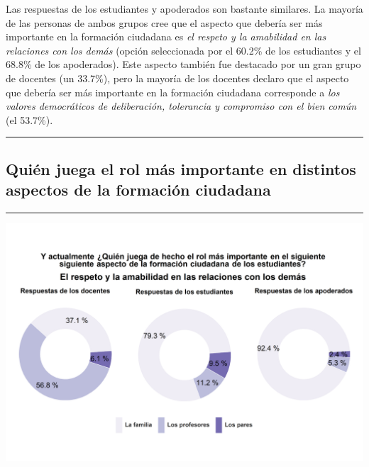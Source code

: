 \documentclass[
  14pt,
]{book}
\let\origfigure\figure
\let\endorigfigure\endfigure
\renewenvironment{figure}[1][2] {
  \expandafter\origfigure\expandafter[H]
} {
  \endorigfigure
}
\begin{document}
Las respuestas de los estudiantes y apoderados son bastante similares. La mayoría de las personas de ambos grupos cree que el aspecto que debería ser más importante en la formación ciudadana es \emph{el respeto y la amabilidad en las relaciones con los demás} (opción seleccionada por el 60.2\% de los estudiantes y el 68.8\% de los apoderados). Este aspecto también fue destacado por un gran grupo de docentes (un 33.7\%), pero la mayoría de los docentes declaro que el aspecto que debería ser más importante en la formación ciudadana corresponde a \emph{los valores democráticos de deliberación, tolerancia y compromiso con el bien común} (el 53.7\%).

\begin{center}\rule{0.5\linewidth}{0.5pt}\end{center}

\hypertarget{quiuxe9n-juega-el-rol-muxe1s-importante-en-distintos-aspectos-de-la-formaciuxf3n-ciudadana}{%
\subsection{Quién juega el rol más importante en distintos aspectos de la formación ciudadana}\label{quiuxe9n-juega-el-rol-muxe1s-importante-en-distintos-aspectos-de-la-formaciuxf3n-ciudadana}}

\begin{center}\rule{0.5\linewidth}{0.5pt}\end{center}

\begin{figure}[!ht]

{\centering \includegraphics[width=0.8\linewidth,]{images/graph_for_ciud7} 

}

\caption{Quién juega el rol más importante en el respeto en las relaciones con los demás}\label{fig:unnamed-chunk-31}
\end{figure}
\end{document}
